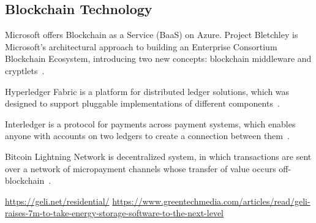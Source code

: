 \subsection{Blockchain Technology}

Microsoft offers Blockchain as a Service (BaaS) on Azure.
Project Bletchley is Microsoft's architectural approach to building an Enterprise Consortium Blockchain Ecosystem, introducing two new concepts: blockchain middleware and cryptlets~\cite{gray2016introducing}.

Hyperledger Fabric is a platform for distributed ledger solutions, which was designed to support pluggable implementations of different components~\cite{hyperledger2017fabric}.

Interledger is a protocol for payments across payment systems, which enables anyone with accounts on two ledgers to create
a connection between them~\cite{thomas_protocol}.

Bitcoin Lightning Network is decentralized system, in which transactions are sent over a network of micropayment channels whose transfer of value occurs off-blockchain~\cite{poon2016bitcoin}.

\url{https://geli.net/residential/}
\url{https://www.greentechmedia.com/articles/read/geli-raises-7m-to-take-energy-storage-software-to-the-next-level}
